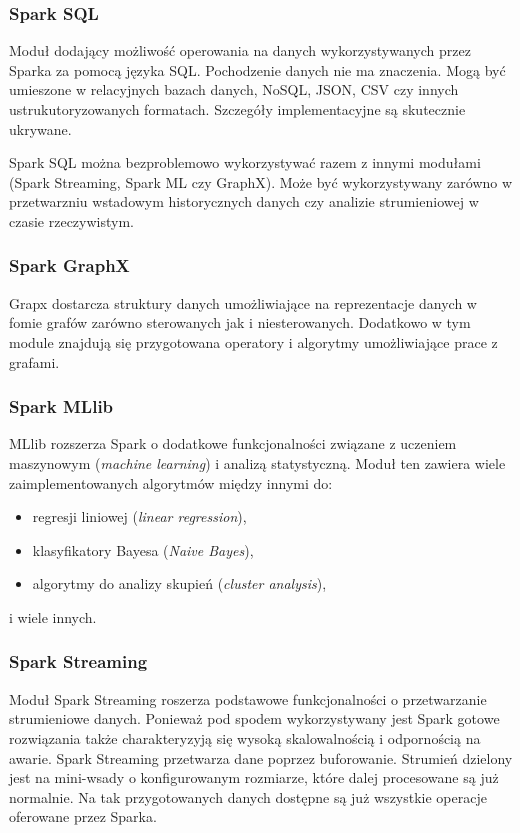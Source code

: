 \subsubsection*{Spark SQL}
Moduł dodający możliwość operowania na danych wykorzystywanych przez Sparka za pomocą języka SQL.
Pochodzenie danych nie ma znaczenia. Mogą być umieszone w
relacyjnych bazach danych, NoSQL, JSON, CSV czy innych ustrukutoryzowanych formatach.
Szczegóły implementacyjne są skutecznie ukrywane.

Spark SQL można bezproblemowo wykorzystywać razem z innymi modułami (Spark Streaming, Spark ML czy GraphX).
Może być wykorzystywany zarówno w przetwarzniu wstadowym historycznych danych
czy analizie strumieniowej w czasie rzeczywistym.
\subsubsection*{Spark GraphX}
Grapx dostarcza struktury danych umożliwiające na reprezentacje danych w fomie grafów
zarówno sterowanych jak i niesterowanych.
Dodatkowo w tym module znajdują się przygotowana operatory i algorytmy umożliwiające prace z grafami.
\subsubsection*{Spark MLlib}
MLlib rozszerza Spark o dodatkowe funkcjonalności związane z uczeniem maszynowym (\textit{machine learning})
i analizą statystyczną.
Moduł ten zawiera wiele zaimplementowanych algorytmów między innymi do:
\begin{itemize}
  \item regresji liniowej (\textit{linear regression}),
  \item klasyfikatory Bayesa (\textit{Naive Bayes}),
  \item algorytmy do analizy skupień (\textit{cluster analysis}),
\end{itemize}
i wiele innych.
\subsubsection*{Spark Streaming}
Moduł Spark Streaming roszerza podstawowe funkcjonalności o przetwarzanie strumieniowe danych.
Ponieważ pod spodem wykorzystywany jest Spark gotowe rozwiązania także charakteryzyją się wysoką skalowalnością
i odpornością na awarie.
Spark Streaming przetwarza dane poprzez buforowanie.
Strumień dzielony jest na mini-wsady o konfigurowanym rozmiarze,
które dalej procesowane są już normalnie.
Na tak przygotowanych danych dostępne są już wszystkie operacje oferowane przez Sparka.
